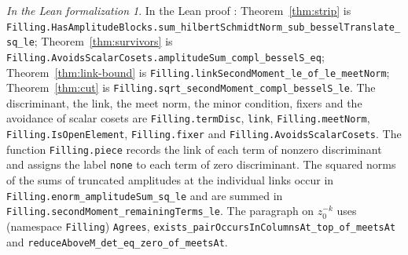 \documentclass[reqno]{amsart}
\theoremstyle{definition}
\theoremstyle{plain}
\theoremstyle{remark}
\newtheorem*{leanremark}{In the Lean formalization}
\newcommand{\tl}[1]{\texttt{#1}}
\begin{document}
\begin{leanremark}
\raggedright In the Lean proof \cite{GL}: Theorem~\ref{thm:strip} is \tl{Filling.HasAmplitudeBlocks.}\allowbreak\tl{sum\_hilbertSchmidtNorm\_sub\_besselTranslate\_sq\_le}; Theorem~\ref{thm:survivors} is \tl{Filling.AvoidsScalarCosets.amplitudeSum\_compl\_besselS\_eq}; Theorem~\ref{thm:link-bound} is \tl{Filling.linkSecondMoment\_le\_of\_le\_meetNorm}; Theorem~\ref{thm:cut} is \tl{Filling.sqrt\_secondMoment\_compl\_besselS\_le}.  The discriminant, the link, the meet norm, the minor condition, fixers and the avoidance of scalar cosets are \tl{Filling.termDisc}, \tl{link}, \tl{Filling.meetNorm}, \tl{Filling.IsOpenElement}, \tl{Filling.fixer} and \tl{Filling.AvoidsScalarCosets}.  The function \tl{Filling.piece} records the link of each term of nonzero discriminant and assigns the label \tl{none} to each term of zero discriminant.  The squared norms of the sums of truncated amplitudes at the individual links occur in \tl{Filling.enorm\_amplitudeSum\_sq\_le} and are summed in \tl{Filling.secondMoment\_remainingTerms\_le}.  The paragraph on \(z_0^{-k}\) uses (namespace \tl{Filling}) \tl{Agrees}, \tl{exists\_pairOccursInColumnsAt\_top\_of\_meetsAt} and \tl{reduceAboveM\_det\_eq\_zero\_of\_meetsAt}.


\end{leanremark}
\end{document}
